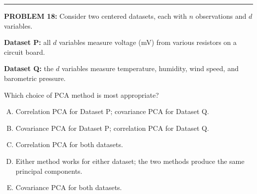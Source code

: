 \documentclass[12pt]{amsart}
\newcommand{\divider}{
  \vspace{-1em} %
  \noindent
  \raisebox{-0.15ex}{\textbullet}%
  \hspace{0.5em}%
  \rule[0.5ex]{0.95\textwidth}{1.0pt}%
  \hspace{0.5em}%
  \raisebox{-0.15ex}{\textbullet}%
  \vspace{0em} %
}
\begin{document}
%
%
%

\divider


{\bf PROBLEM 18:}
Consider two centered datasets, each with $n$ observations and $d$ variables.

\textbf{Dataset P:} all $d$ variables measure voltage (mV) from various resistors on a circuit board.

\textbf{Dataset Q:} the $d$ variables measure temperature, humidity, wind speed, and barometric pressure.

Which choice of PCA method is most appropriate?

\begin{enumerate}[(A)]
\item Correlation PCA for Dataset P; covariance PCA for Dataset Q.
\item Covariance PCA for Dataset P; correlation PCA for Dataset Q.
\item Correlation PCA for both datasets.
\item Either method works for either dataset; the two methods produce the same principal components.
\item Covariance PCA for both datasets.
\end{enumerate}
\end{document}
